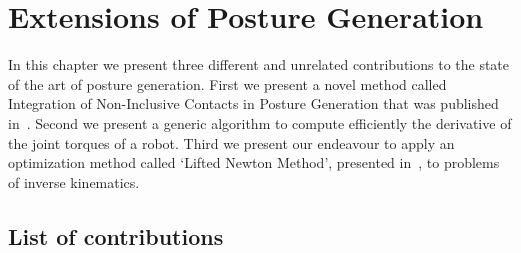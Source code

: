

\chapter{Extensions of Posture Generation}
\label{cha:extensions_of_posture_generation}

In this chapter we present three different and unrelated contributions to the state of the art of posture generation.
First we present a novel method called Integration of Non-Inclusive Contacts in Posture Generation that was published in~\cite{brossette:iros:2014}.
Second we present a generic algorithm to compute efficiently the derivative of the joint torques of a robot.
Third we present our endeavour to apply an optimization method called `Lifted Newton Method', presented in~\cite{Albersmeyer:2010:LNM:1958447.1958472}, to problems of inverse kinematics.



\section{List of contributions}


